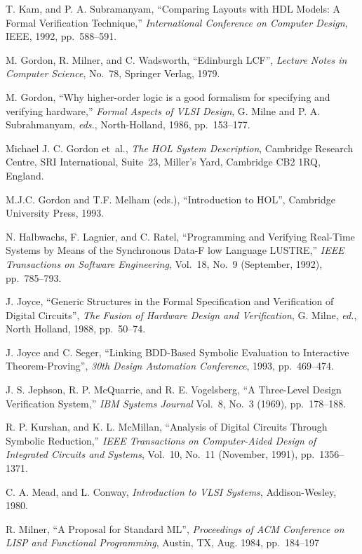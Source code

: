 \begin{thebibliography}{99}
T. Kam, and P. A. Subramanyam,
``Comparing Layouts with HDL Models: A Formal Verification Technique,''
{\it International Conference on Computer Design},
IEEE, 1992, pp.~588--591.


M. Gordon, R. Milner, and C. Wadsworth, ``Edinburgh LCF'',
{\em Lecture Notes in Computer Science},
No.~78, Springer Verlag, 1979.

M. Gordon,
``Why higher-order logic is a good formalism for specifying and verifying
hardware,''
{\em Formal Aspects of VLSI Design}, G. Milne and P. A. Subrahmanyam, {\em
eds.}, North-Holland, 1986, pp.~153--177.

Michael J. C. Gordon et~al., {\em The HOL System Description},
Cambridge Research Centre, SRI International, Suite~23, Miller's Yard,
Cambridge CB2 1RQ, England.

M.J.C. Gordon and T.F. Melham (eds.),
``Introduction to HOL'',
Cambridge University Press, 1993.


N. Halbwachs, F. Lagnier, and C. Ratel,
``Programming and Verifying Real-Time Systems by Means of the Synchronous Data-F
low Language LUSTRE,''
{\em IEEE Transactions on Software Engineering},
Vol.~18, No.~9 (September, 1992), pp.~785--793.

J. Joyce, ``Generic Structures in the Formal Specification and Verification
of Digital Circuits'', {\em The Fusion of Hardware Design and Verification},
G. Milne, {\em ed.}, North Holland, 1988, pp.~50--74.

J. Joyce and C. Seger, ``Linking BDD-Based Symbolic Evaluation
to Interactive Theorem-Proving'', {\it 30th Design Automation Conference},
1993, pp.~469--474.

J. S. Jephson,  R. P. McQuarrie, and R. E. Vogelsberg,
``A Three-Level Design Verification System,''
{\it IBM Systems Journal} Vol.~8, No.~3
(1969), pp.~178--188.

R. P. Kurshan, and K. L. McMillan,
``Analysis of Digital Circuits Through Symbolic Reduction,''
{\em IEEE Transactions on Computer-Aided Design
of Integrated Circuits and Systems}, Vol.~10, No.~11 (November, 1991),
pp.~1356--1371.

C. A. Mead, and L. Conway,
{\it Introduction to VLSI Systems},
Addison-Wesley, 1980.

R. Milner, ``A Proposal for Standard ML'',
{\it Proceedings of ACM Conference on LISP and Functional Programming},
Austin, TX, Aug. 1984, pp.~184--197


\end{thebibliography}
